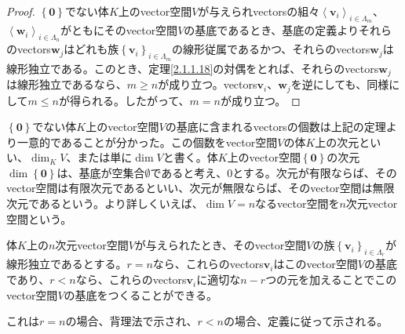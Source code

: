 \documentclass[dvipdfmx]{jsarticle}
\begin{document}
\begin{proof}
$\left\{ \mathbf{0} \right\}$でない体$K$上のvector空間$V$が与えられvectorsの組々$\left\langle \mathbf{v}_{i} \right\rangle_{i \in \varLambda_{m}}$、$\left\langle \mathbf{w}_{i} \right\rangle_{i \in \varLambda_{n}}$がともにそのvector空間$V$の基底であるとき、基底の定義よりそれらのvectors$\mathbf{w}_{j}$はどれも族$\left\{ \mathbf{v}_i \right\}_{i \in \varLambda_{m} } $の線形従属であるかつ、それらのvectors$\mathbf{w}_{j}$は線形独立である。このとき、定理\ref{2.1.1.18}の対偶をとれば、それらのvectors$\mathbf{w}_{j}$は線形独立であるなら、$m \geq n$が成り立つ。vectors$\mathbf{v}_{i}$、$\mathbf{w}_{j}$を逆にしても、同様にして$m \leq n$が得られる。したがって、$m = n$が成り立つ。
\end{proof}
\begin{dfn}
$\left\{ \mathbf{0} \right\}$でない体$K$上のvector空間$V$の基底に含まれるvectorsの個数は上記の定理より一意的であることが分かった。この個数をvector空間$V$の体$K$上の次元といい、$\dim_{K}V$、または単に$\dim V$と書く。体$K$上のvector空間$\left\{ \mathbf{0} \right\}$の次元$\dim\left\{ \mathbf{0} \right\}$は、基底が空集合$\emptyset $であると考え、$0$とする。次元が有限ならば、そのvector空間は有限次元であるといい、次元が無限ならば、そのvector空間は無限次元であるという。より詳しくいえば、$\dim V = n$なるvector空間を$n$次元vector空間という。
\end{dfn}
\begin{thm}\label{2.1.1.20}
体$K$上の$n$次元vector空間$V$が与えられたとき、そのvector空間$V$の族$\left\{ \mathbf{v}_{i} \right\}_{i \in \varLambda_{r}} $が線形独立であるとする。$r = n$なら、これらのvectors$\mathbf{v}_{i}$はこのvector空間$V$の基底であり、$r < n$なら、これらのvectors$\mathbf{v}_{i}$に適切な$n - r$つの元を加えることでこのvector空間$V$の基底をつくることができる。
\end{thm}\par
これは$r = n$の場合、背理法で示され、$r < n$の場合、定義に従って示される。
\end{document}
